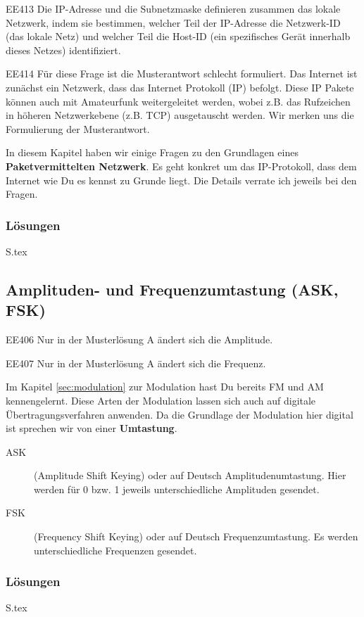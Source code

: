 \documentclass[10pt,a4paper,ngerman]{article}
\theoremstyle{definition}
\theoremstyle{plain}
\theoremstyle{mytheorem}
\theoremstyle{definition}
\newenvironment{ohmchapter}{}
{
  \subsubsection*{Lösungen}
  S\arabic{subsection}.tex}
}
\begin{document}
\begin{sol}{EE413}
Die IP-Adresse und die Subnetzmaske definieren zusammen das lokale Netzwerk, indem sie bestimmen, welcher Teil der IP-Adresse die Netzwerk-ID (das lokale Netz) und welcher Teil die Host-ID (ein spezifisches Gerät innerhalb dieses Netzes) identifiziert.
\end{sol}

\begin{sol}{EE414}
  Für diese Frage ist die Musterantwort schlecht formuliert. Das Internet ist zunächst ein Netzwerk, dass das Internet Protokoll (IP) befolgt. Diese IP Pakete können auch mit Amateurfunk weitergeleitet werden, wobei z.B. das Rufzeichen in höheren Netzwerkebene (z.B. TCP) ausgetauscht werden. Wir merken uns die Formulierung der Musterantwort.
\end{sol}


\begin{ohmchapter}
In diesem Kapitel haben wir einige Fragen zu den Grundlagen eines \textbf{Paketvermittelten Netzwerk}. Es geht konkret um das IP-Protokoll, dass dem Internet wie Du es kennst zu Grunde liegt. Die Details verrate ich jeweils bei den Fragen.

\end{ohmchapter}


\subsection{Amplituden- und Frequenzumtastung (ASK, FSK)}

\begin{sol}{EE406}
Nur in der Musterlösung A ändert sich die Amplitude.
\end{sol}


\begin{sol}{EE407}
Nur in der Musterlösung A ändert sich die Frequenz.
\end{sol}

\begin{ohmchapter}
  Im Kapitel \ref{sec:modulation} zur Modulation hast Du bereits FM und AM kennengelernt. 
  Diese Arten der Modulation lassen sich auch auf digitale Übertragungsverfahren anwenden.
  Da die Grundlage der Modulation hier digital ist sprechen wir von einer \textbf{Umtastung}.

  \begin{description}
    \item[ASK] (Amplitude Shift Keying) oder auf Deutsch Amplitudenumtastung.
    Hier werden für 0 bzw. 1 jeweils unterschiedliche Amplituden gesendet.
    \item[FSK] (Frequency Shift Keying) oder auf Deutsch Frequenzumtastung. Es werden unterschiedliche Frequenzen gesendet. 
  \end{description}

\end{ohmchapter}
\end{document}
